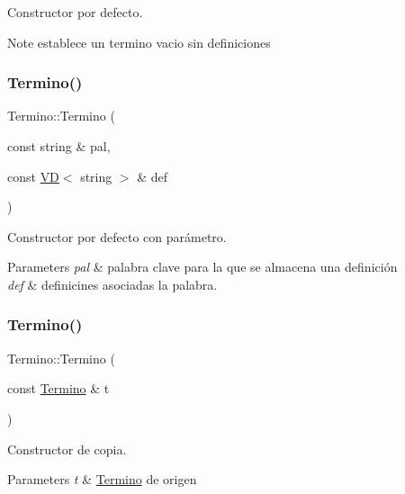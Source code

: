 Constructor por defecto. 

\begin{DoxyNote}{Note}
establece un termino vacio sin definiciones 
\end{DoxyNote}
\mbox{\label{class_termino_af3f809601058b89ee169ac3c47b87307}} 
\subsubsection{\texorpdfstring{Termino()}{Termino()}\hspace{0.1cm}{\footnotesize\ttfamily [2/3]}}
{\footnotesize\ttfamily Termino\+::\+Termino (\begin{DoxyParamCaption}\item[{const string \&}]{pal,  }\item[{const \mbox{\hyperlink{class_v_d}{VD}}$<$ string $>$ \&}]{def }\end{DoxyParamCaption})}



Constructor por defecto con parámetro. 


\begin{DoxyParams}{Parameters}
{\em pal} & palabra clave para la que se almacena una definición \\
\hline
{\em def} & definicines asociadas la palabra. \\
\hline
\end{DoxyParams}
\mbox{\label{class_termino_aca157aa3fd8d1d0e8fa49ac0855597e7}} 
\subsubsection{\texorpdfstring{Termino()}{Termino()}\hspace{0.1cm}{\footnotesize\ttfamily [3/3]}}
{\footnotesize\ttfamily Termino\+::\+Termino (\begin{DoxyParamCaption}\item[{const \mbox{\hyperlink{class_termino}{Termino}} \&}]{t }\end{DoxyParamCaption})}



Constructor de copia. 


\begin{DoxyParams}{Parameters}
{\em t} & \mbox{\hyperlink{class_termino}{Termino}} de origen \\
\hline
\end{DoxyParams}


